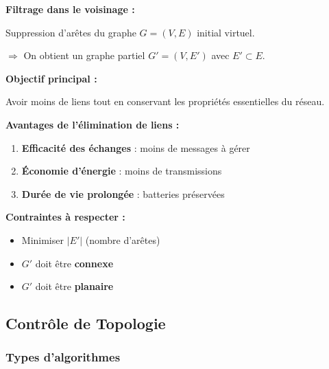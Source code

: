 \documentclass[12pt,a4paper]{article}
\begin{document}
\begin{definition}
\textbf{Filtrage dans le voisinage :}

Suppression d'arêtes du graphe $G = (V, E)$ initial virtuel.

$\Rightarrow$ On obtient un graphe partiel $G' = (V, E')$ avec $E' \subset E$.

\textbf{Objectif principal :}

Avoir moins de liens tout en conservant les propriétés essentielles du réseau.
\end{definition}

\begin{important}
\textbf{Avantages de l'élimination de liens :}

\begin{enumerate}
    \item \textcolor{defvert}{\textbf{Efficacité des échanges}} : moins de messages à gérer
    \item \textcolor{titrebleu}{\textbf{Économie d'énergie}} : moins de transmissions
    \item \textcolor{algoviolet}{\textbf{Durée de vie prolongée}} : batteries préservées
\end{enumerate}

\textbf{Contraintes à respecter :}

\begin{itemize}
    \item Minimiser $|E'|$ (nombre d'arêtes)
    \item $G'$ doit être \textcolor{importantrouge}{\textbf{connexe}}
    \item $G'$ doit être \textcolor{exempleorange}{\textbf{planaire}}
\end{itemize}
\end{important}

\newpage
\subsection{Contrôle de Topologie}

\subsubsection{Types d'algorithmes}
\end{document}

